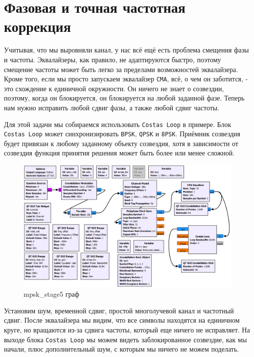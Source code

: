 \documentclass[a4paper,12pt]{report}
\begin{document}
\chapter{Фазовая и точная частотная коррекция}

Учитывая, что мы выровняли канал, у нас всё ещё есть проблема смещения фазы и частоты. Эквалайзеры, как правило, не адаптируются быстро, поэтому смещение частоты может быть легко за пределами возможностей эквалайзера. Кроме того, если мы просто запускаем эквалайзер \texttt{CMA}, всё, о чем он заботится, - это схождение к единичной окружности. Он ничего не знает о созвездии, поэтому, когда он блокируется, он блокируется на любой заданной фазе. Теперь нам нужно исправить любой сдвиг фазы, а также любой сдвиг частоты.

Для этой задачи мы собираемся использовать \texttt{Costas Loop} в примере. Блок \texttt{Costas Loop} может синхронизировать \texttt{BPSK}, \texttt{QPSK} и \texttt{8PSK}. Приёмник созвездия будет привязан к любому заданному объекту созвездия, хотя в зависимости от созвездия функция принятия решения может быть более или менее сложной.

\begin{figure}[H]
        \centering
        \includegraphics[width=1.0\textwidth]{25.png}
        \caption{mpsk\_stage5 граф}
        \label{fig:lab12_fig6_1}
\end{figure}

Установим шум, временной сдвиг, простой многолучевой канал и частотный сдвиг. После эквалайзера мы видим, что все символы находятся на единичном круге, но вращаются из-за сдвига частоты, который еще ничего не исправляет. На выходе блока \texttt{Costas Loop} мы можем видеть заблокированное созвездие, как мы начали, плюс дополнительный шум, с которым мы ничего не можем поделать.
\end{document}
